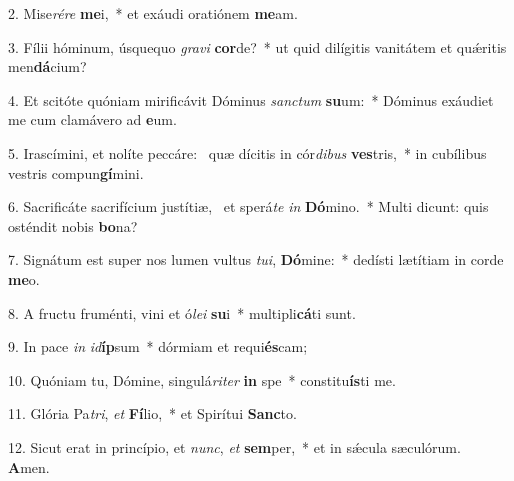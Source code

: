 2. Mise\textit{ré}\textit{re} \textbf{me}i,~*  et exáudi oratiónem \textbf{me}am.\

3. Fílii hóminum, úsquequo \textit{gra}\textit{vi} \textbf{cor}de?~*  ut quid dilígitis vanitátem et quǽritis men\textbf{dá}cium?\

4. Et scitóte quóniam mirificávit Dóminus \textit{sanc}\textit{tum} \textbf{su}um:~*  Dóminus exáudiet me cum clamávero ad \textbf{e}um.\

5. Irascímini, et nolíte peccáre: \dag\  quæ dícitis in cór\textit{di}\textit{bus} \textbf{ves}tris,~*  in cubílibus vestris compun\textbf{gí}mini.\

6. Sacrificáte sacrifícium justítiæ, \dag\  et sperá\textit{te} \textit{in} \textbf{Dó}mino.~*  Multi dicunt: quis osténdit nobis \textbf{bo}na?\

7. Signátum est super nos lumen vultus \textit{tu}\textit{i}, \textbf{Dó}mine:~*  dedísti lætítiam in corde \textbf{me}o.\

8. A fructu fruménti, vini et ó\textit{le}\textit{i} \textbf{su}i~*  multipli\textbf{cá}ti sunt.\

9. In pace \textit{in} \textit{id}\textbf{íp}sum~*  dórmiam et requi\textbf{és}cam;\

10. Quóniam tu, Dómine, singulá\textit{ri}\textit{ter} \textbf{in} spe~*  constitu\textbf{ís}ti me.\

11. Glória Pa\textit{tri}, \textit{et} \textbf{Fí}lio,~*  et Spirítui \textbf{Sanc}to.\

12. Sicut erat in princípio, et \textit{nunc}, \textit{et} \textbf{sem}per,~*  et in sǽcula sæculórum. \textbf{A}men.\

